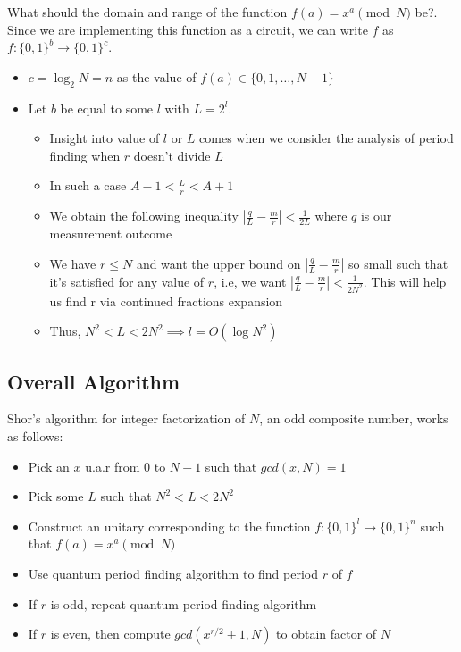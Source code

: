 \documentclass[11.5pt, paper=a4]{article}
\theoremstyle{definition}
\numberwithin{theorem}{section}
\begin{document}
\begin{tcolorbox}[sharp corners,title=Quick aside on function $f$]
What should the domain and range of the function $f(a) = x^a\pmod{N}$ be?. Since we are implementing this function as a circuit, we can write $f$ as $f:\{0,1\}^b\rightarrow\{0,1\}^c$.
\begin{itemize}
    \item $c = \log_2N = n$ as the value of $f(a) \in \{0,1,\dots, N-1\}$
    \item Let $b$ be equal to some $l$ with $L = 2^l$. 
    \begin{itemize}
        \item Insight into value of $l$ or $L$ comes when we consider the analysis of period finding when $r$ doesn't divide $L$
        \item In such a case $A - 1 < \frac{L}{r} < A + 1$
        \item We obtain the following inequality $|\frac{q}{L} - \frac{m}{r}| < \frac{1}{2L}$ where $q$ is our measurement outcome
        \item We have $r \le N$ and want the upper bound on $|\frac{q}{L} - \frac{m}{r}|$ so small such that it's satisfied for any value of $r$, i.e, we want $|\frac{q}{L} - \frac{m}{r}| < \frac{1}{2N^2}$. This will help us find r via continued fractions expansion
        \item Thus, $N^2 < L < 2N^2 \implies l = O(\log N^2)$
    \end{itemize}
\end{itemize}
\end{tcolorbox}

\subsection{Overall Algorithm}
Shor's algorithm for integer factorization of $N$, an odd composite number, works as follows:
\begin{itemize}
    \item Pick an $x$ u.a.r from $0$ to $N-1$ such that $gcd(x, N) =1$
    \item Pick some $L$ such that $N^2 < L < 2N^2$
    \item Construct an unitary corresponding to the function $f:\{0, 1\}^l\rightarrow\{0,1\}^n$ such that $f(a) = x^a\pmod{N}$
    \item Use quantum period finding algorithm to find period $r$ of $f$
    \item If $r$ is odd, repeat quantum period finding algorithm
    \item If $r$ is even, then compute $gcd(x^{r/2} \pm 1, N)$ to obtain factor of $N$
\end{itemize}
\end{document}
